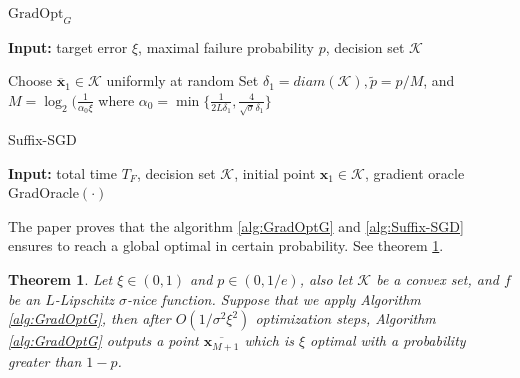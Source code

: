 \begin{algorithm}
\caption{$\text{GradOpt}_G$}
\label{alg:GradOptG}
{\bfseries Input:} target error $\xi$, maximal failure probability $p$, decision set $\mathcal{K}$
\begin{algorithmic}[1]
\State Choose $\overline{\mathbf{x}}_1 \in \mathcal{K}$ uniformly at random
\State Set $\delta_1 = diam(\mathcal{K}), \tilde{p} = p/M$, and $M = \log_2(\frac{1}{\alpha_0\xi}$ where $\alpha_0=\min\big\{\frac{1}{2L\delta_1}, \frac{4}{\sqrt{\sigma}\delta_1}\big\}$  
\EndFor
\State {}
\end{algorithmic}
\end{algorithm}

\begin{algorithm}
\caption{Suffix-SGD}
\label{alg:Suffix-SGD}
{\bfseries Input:} total time $T_F$, decision set $\mathcal{K}$, initial point $\mathbf{x}_1 \in \mathcal{K}$, gradient oracle GradOracle$(\cdot)$
\begin{algorithmic}[1]
\EndFor
\State {} 
\end{algorithmic}
\end{algorithm}

The paper proves that the algorithm \ref{alg:GradOptG} and \ref{alg:Suffix-SGD} ensures to reach a global optimal in certain probability. See theorem \ref{theorem:GradOptG}.
\newtheorem{theorem:GradOptG}{Theorem}
\begin{theorem:GradOptG}
\label{theorem:GradOptG}
Let $\xi \in (0,1)$ and $p \in (0, 1/e)$, also let $\mathcal{K}$ be a convex set, and $f$ be an $L$-Lipschitz $\sigma$-nice function. Suppose that we apply Algorithm \ref{alg:GradOptG}, then after $O(1/\sigma^2\xi^2)$ optimization steps, Algorithm \ref{alg:GradOptG} outputs a point $\overline{\mathbf{x}_{M+1}}$ which is $\xi$ optimal with a probability greater than $1-p$.
\end{theorem:GradOptG}

